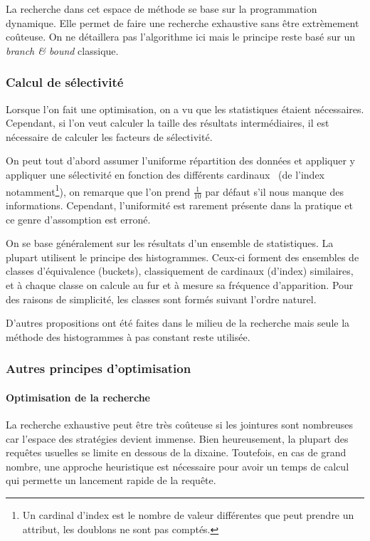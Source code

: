 La recherche dans cet espace de méthode se base sur la programmation dynamique. Elle permet de faire une recherche exhaustive sans être extrèmement coûteuse. On ne détaillera pas l'algorithme ici mais le principe reste basé sur un \textit{branch \& bound} classique.

\subsubsection{Calcul de sélectivité}
Lorsque l'on fait une optimisation, on a vu que les statistiques étaient nécessaires. Cependant, si l'on veut calculer la taille des résultats intermédiaires, il est nécessaire de calculer les facteurs de sélectivité. 

On peut tout d'abord assumer l'uniforme répartition des données et appliquer y appliquer une sélectivité en fonction des différents cardinaux~\cite{Selinger:selectivity} (de l'index notamment\footnote{Un cardinal d'index est le nombre de valeur différentes que peut prendre un attribut, les doublons ne sont pas comptés.}), on remarque que l'on prend $\frac{1}{10}$ par défaut s'il nous manque des informations. Cependant, l'uniformité est rarement présente dans la pratique et ce genre d'assomption est erroné.

On se base généralement sur les résultats d'un ensemble de statistiques. La plupart utilisent le principe des histogrammes. Ceux-ci forment des ensembles de classes d'équivalence (buckets), classiquement de cardinaux (d'index) similaires, et à chaque classe on calcule au fur et à mesure sa fréquence d'apparition. Pour des raisons de simplicité, les classes sont formés suivant l'ordre naturel.

D'autres propositions ont été faites dans le milieu de la recherche mais seule la méthode des histogrammes à pas constant reste utilisée.

\subsubsection{Autres principes d'optimisation}
\paragraph*{Optimisation de la recherche}
La recherche exhaustive peut être très coûteuse si les jointures sont nombreuses car l'espace des stratégies devient immense. Bien heureusement, la plupart des requêtes usuelles se limite en dessous de la dixaine. Toutefois, en cas de grand nombre, une approche heuristique est nécessaire pour avoir un temps de calcul qui permette un lancement rapide de la requête. 

